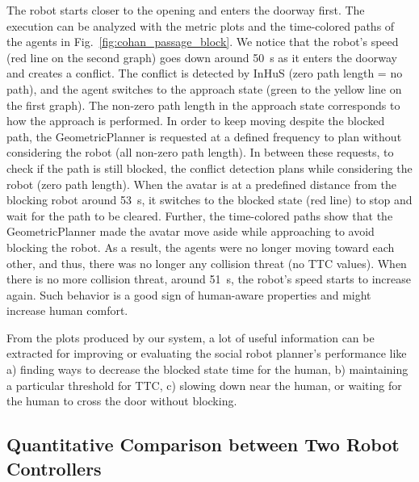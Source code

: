 The robot starts closer to the opening and enters the doorway first. The execution can be analyzed with the metric plots and the time-colored paths of the agents in Fig.~\ref{fig:cohan_passage_block}. We notice that the robot's speed (red line on the second graph) goes down around \SI{50}{\second} as it enters the doorway and creates a conflict. The conflict is detected by InHuS (zero path length = no path), and the agent switches to the approach state (green to the yellow line on the first graph).
The non-zero path length in the approach state corresponds to how the approach is performed. In order to keep moving despite the blocked path, the GeometricPlanner is requested at a defined frequency to plan without considering the robot (all non-zero path length). In between these requests, to check if the path is still blocked, the conflict detection plans while considering the robot (zero path length). When the avatar is at a predefined distance from the blocking robot around \SI{53}{\second}, it switches to the blocked state (red line) to stop and wait for the path to be cleared. Further, the time-colored paths show that the GeometricPlanner made the avatar move aside while approaching to avoid blocking the robot. As a result, the agents were no longer moving toward each other, and thus, there was no longer any collision threat (no TTC values). When there is no more collision threat, around \SI{51}{\second}, the robot's speed starts to increase again. Such behavior is a good sign of human-aware properties and might increase human comfort.

From the plots produced by our system, a lot of useful information can be extracted for improving or evaluating the social robot planner's performance like a) finding ways to decrease the blocked state time for the human, b) maintaining a particular threshold for TTC, c) slowing down near the human, or waiting for the human to cross the door without blocking.


\subsection{Quantitative Comparison between Two Robot Controllers}

